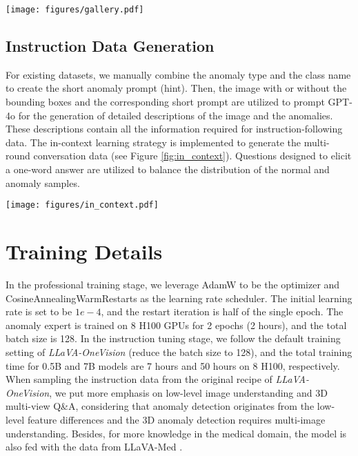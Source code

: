 \begin{figure*}[!t]
\centering
    \texttt{[image: figures/gallery.pdf]}
\caption{Overview of the gallery for in-the-wild image samples in WebAD. The images on the left side are anomalous, while the right side is for normal images. The links to download these images will be released to avoid copyright issues.}
\label{fig:gallery}
\end{figure*}

\subsection{Instruction Data Generation}
For existing datasets, we manually combine the anomaly type and the class name to create the short anomaly prompt (hint). Then, the image with or without the bounding boxes and the corresponding short prompt are utilized to prompt GPT-4o for the generation of detailed descriptions of the image and the anomalies. These descriptions contain all the information required for instruction-following data. The in-context learning strategy is implemented to generate the multi-round conversation data (see Figure \ref{fig:in_context}). Questions designed to elicit a one-word answer are utilized to balance the distribution of the normal and anomaly samples.

\begin{figure*}[!t]
\centering
    \texttt{[image: figures/in\_context.pdf]}
\caption{Prompt template for generating multi-round conversation in Anomaly-Instruct-125k (modified from the template of LLaVA \cite{llava}).}
\label{fig:in_context}
\vspace{-3mm}
\end{figure*}

\section{Training Details}
In the professional training stage, we leverage AdamW \cite{adamw} to be the optimizer and CosineAnnealingWarmRestarts \cite{loshchilov2017sgdr} as the learning rate scheduler. The initial learning rate is set to be $1e-4$, and the restart iteration is half of the single epoch. The anomaly expert is trained on 8 H100 GPUs for 2 epochs (2 hours), and the total batch size is 128. In the instruction tuning stage, we follow the default training setting of \textit{LLaVA-OneVision} \cite{llavaonevision} (reduce the batch size to 128), and the total training time for 0.5B and 7B models are 7 hours and 50 hours on 8 H100, respectively. When sampling the instruction data from the original recipe of \textit{LLaVA-OneVision}, we put more emphasis on low-level image understanding and 3D multi-view Q\&A, considering that anomaly detection originates from the low-level feature differences and the 3D anomaly detection requires multi-image understanding. Besides, for more knowledge in the medical domain, the model is also fed with the data from LLaVA-Med \cite{llavamed}.




